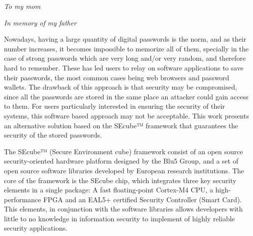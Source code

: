 \documentclass[%
    corpo=13pt,
    twoside,
    oldstyle,
    autoretitolo,
    greek,
    evenboxes,
    numerazioneromana,
    tipotesi=magistrale,
]{toptesi}
\begin{document}
 \frontespizio %
 
%
   

\frontmatter


\begin{flushright}
\vspace*{30pt}
\noindent
{\Large\textit{To my mom}}

{\Large\textit{\textdagger \hspace{1pt} In memory of my father}}

\end{flushright}
\listoftodos

\sommario

Nowadays, having a large quantity of digital passwords is the norm, and as their number increases, it becomes impossible to memorize all of them, specially in the case of strong passwords which are very long and/or very random, and therefore hard to remember. These has led users to relay on software applications to save their passwords, the most common cases being web browsers and password wallets. The drawback of this approach is that security may be compromised, since all the passwords are stored in the same place an attacker could gain access to them. For users particularly interested in ensuring the security of their systems, this software based approach may not be acceptable. This work presents an alternative solution based on the SEcube™ framework that guarantees the security of the stored passwords.

The SEcube™ (Secure Environment cube) framework consist of an open source security-oriented hardware platform designed by the Blu5 Group, and a set of open source software libraries developed by European research institutions. The core of the framework is the SEcube chip, which integrates three key security elements in a single package: A fast floating-point Cortex-M4 CPU, a high-performance FPGA and an EAL5+ certified Security Controller (Smart Card). This elements, in conjunction with the software libraries allows developers with little to no knowledge in information security to implement of highly reliable security applications.
\end{document}
